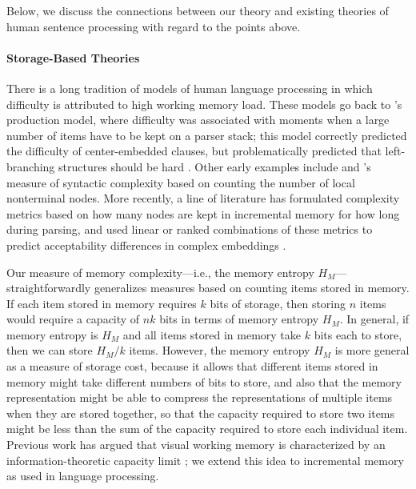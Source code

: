 Below, we discuss the connections between our theory and existing theories of human sentence processing with regard to the points above.

\paragraph{Storage-Based Theories}

There is a long tradition of models of human language processing in which difficulty is attributed to high working memory load. 
These models go back to \citet{yngve1960model}'s production model, where difficulty was associated with moments when a large number of items have to be kept on a parser stack; this model correctly predicted the difficulty of center-embedded clauses, but problematically predicted that left-branching structures should be hard \citep{kimball1973seven}. Other early examples include \citet{miller-finitary-1963} and \citet{frazier1985syntactic}'s measure of syntactic complexity based on counting the number of local nonterminal nodes. More recently, a line of literature has formulated complexity metrics based on how many nodes are kept in incremental memory for how long during parsing, and used linear or ranked combinations of these metrics to predict acceptability differences in complex embeddings \citep{kobele2013memory,graf2014evaluating,rambow201512,GrafEtAl15MOL,gerth2015memory,GrafEtAl17JLM,desanto2020parsing}.


Our measure of memory complexity---i.e., the memory entropy $H_M$---straightforwardly generalizes measures based on counting items stored in memory. If each item stored in memory requires $k$ bits of storage, then storing $n$ items would require a capacity of $nk$ bits in terms of memory entropy $H_M$. In general, if memory entropy is $H_M$ and all items stored in memory take $k$ bits each to store, then we can store $H_M/k$ items. However, the memory entropy $H_M$ is more general as a measure of storage cost, because it allows that different items stored in memory might take different numbers of bits to store, and also that the memory representation might be able to compress the representations of multiple items when they are stored together, so that the capacity required to store two items might be less than the sum of the capacity required to store each individual item. Previous work has argued that visual working memory is characterized by an information-theoretic capacity limit \citep{brady2008efficient,sims2012ideal}; we extend this idea to incremental memory as used in language processing.

